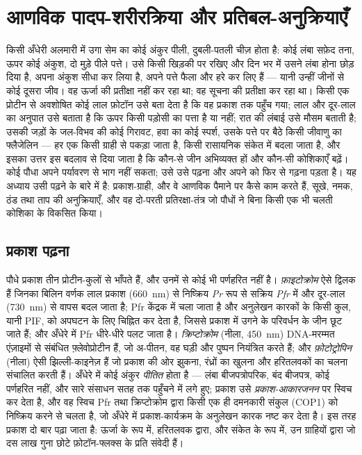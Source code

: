 \chapter{आणविक पादप-शरीरक्रिया और प्रतिबल-अनुक्रियाएँ}\label{ch:b3:plant-molecular-physiology}

किसी अँधेरी अलमारी में उगा सेम का कोई अंकुर पीली, दुबली-पतली चीज़ होता
है: कोई लंबा सफ़ेद तना, ऊपर कोई अंकुश, दो मुड़े पीले पत्ते। उसे किसी
खिड़की पर रखिए और दिन भर में उसने लंबा होना छोड़ दिया है, अपना अंकुश
सीधा कर लिया है, अपने पत्ते फैला और हरे कर लिए हैं --- यानी उन्हीं जीनों
से कोई दूसरा जीव। वह ऊर्जा की प्रतीक्षा नहीं कर रहा था; वह सूचना की
प्रतीक्षा कर रहा था। किसी एक प्रोटीन से अवशोषित कोई लाल फ़ोटॉन उसे बता
देता है कि वह प्रकाश तक पहुँच गया; लाल और दूर-लाल का अनुपात उसे बताता है
कि ऊपर किसी पड़ोसी का पत्ता है या नहीं; रात की लंबाई उसे मौसम बताती है;
उसकी जड़ों के जल-विभव की कोई गिरावट, हवा का कोई स्पर्श, उसके पत्ते पर
बैठे किसी जीवाणु का फ्लैजेलिन --- हर एक किसी ग्राही से पकड़ा जाता है,
किसी रासायनिक संकेत में बदला जाता है, और इसका उत्तर इस बदलाव से दिया
जाता है कि कौन-से जीन अभिव्यक्त हों और कौन-सी कोशिकाएँ बढ़ें। कोई पौधा
अपने पर्यावरण से भाग नहीं सकता; उसे उसे पढ़ना और अपने को फिर से गढ़ना
पड़ता है। यह अध्याय उसी पढ़ने के बारे में है: प्रकाश-ग्राही,  और
वे आणविक पैमाने पर कैसे काम करते हैं, सूखे, नमक, ठंड तथा ताप की
अनुक्रियाएँ, और वह दो-परती प्रतिरक्षा-तंत्र जो पौधों ने बिना किसी एक भी
चलती कोशिका के विकसित किया।

\section{प्रकाश पढ़ना}

\begin{definition}[प्रकाश-ग्राही]\label{def:b3:plant-molecular-physiology:photoreceptors}
पौधे प्रकाश तीन प्रोटीन-कुलों से भाँपते हैं, और उनमें से कोई भी
पर्णहरित नहीं है। \emph{फ़ाइटोक्रोम} ऐसे द्विलक हैं जिनका बिलिन वर्णक
लाल प्रकाश (\qty{660}{nm}) से निष्क्रिय \emph{Pr} रूप से सक्रिय
\emph{Pfr} में और दूर-लाल (\qty{730}{nm}) से वापस बदल जाता है; Pfr
केंद्रक में चला जाता है और अनुलेखन कारकों के किसी कुल, यानी PIF, को
अपघटन के लिए चिह्नित कर देता है, जिससे प्रकाश में उगने के परिवर्धन के
जीन छूट जाते हैं; और अँधेरे में Pfr धीरे-धीरे पलट जाता है।
\emph{क्रिप्टोक्रोम} (नीला, \qty{450}{nm}) DNA-मरम्मत एंज़ाइमों से
संबंधित फ़्लेवोप्रोटीन हैं, जो अ-पीतन, वह घड़ी और पुष्पन नियंत्रित करते
हैं; और \emph{फ़ोटोट्रोपिन} (नीला) ऐसी झिल्ली-काइनेज़ हैं जो प्रकाश की
ओर झुकना, रंध्रों का खुलना और हरितलवकों का चलना संचालित करती हैं।
अँधेरे में कोई अंकुर \emph{पीतित} होता है --- लंबा बीजपत्रोपरिक, बंद
बीजपत्र, कोई पर्णहरित नहीं, और सारे संसाधन सतह तक पहुँचने में लगे हुए;
प्रकाश उसे \emph{प्रकाश-आकारजनन} पर स्विच कर देता है, और वह स्विच
Pfr तथा क्रिप्टोक्रोम द्वारा किसी एक ही दमनकारी संकुल (COP1) को
निष्क्रिय करने से चलता है, जो अँधेरे में प्रकाश-कार्यक्रम के अनुलेखन
कारक नष्ट कर देता है। इस तरह प्रकाश दो बार पढ़ा जाता है: ऊर्जा के रूप
में, हरितलवक द्वारा, और संकेत के रूप में, उन ग्राहियों द्वारा जो दस लाख
गुना छोटे फ़ोटॉन-फ्लक्स के प्रति संवेदी हैं।
\end{definition}

